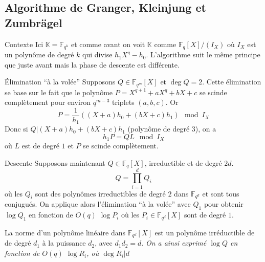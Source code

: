 \documentclass[xcolor=x11names,compress]{beamer}
\theoremstyle{break}
\theoremstyle{sc}
\theoremstyle{definition}
\theoremstyle{remark}
\begin{document}
\subsection{Algorithme de Granger, Kleinjung et Zumbrägel}

\begin{frame}{Contexte}
  Ici $\mathbb{K}=\mathbb{F}_{q^k}$ et comme avant on voit $\mathbb{K}$ comme
  $\mathbb{F}_q[X]/(I_X)$ où $I_X$ est un polynôme de degré $k$ qui divise
  $h_1X^q-h_0$. L'algorithme suit le même principe que juste avant mais la phase
  de descente est différente. 
\end{frame}

\begin{frame}{Élimination ``à la volée''}
  Supposons $Q\in \mathbb{F}_{q^m}[X]$ et $\deg Q = 2$. Cette élimination se base
  sur le fait que le polynôme $P = X^{q+1}+aX^q+bX+c$ se scinde complètement pour
  environ $q^{m-3}$ triplets $(a, b, c)$. Or 
  \[
    P = \frac{1}{h_1}((X+a)h_0 + (bX+c)h_1)\mod I_X
  \]
  Donc si $Q| (X+a)h_0 + (bX+c)h_1$ (polynôme de degré $3$), on a 
  \[
    h_1P=QL \mod I_X
  \]
  où $L$ est de degré $1$ et $P$ se scinde complètement.

\end{frame}

\begin{frame}{Descente}
  Supposons maintenant $Q\in\mathbb{F}_{q}[X]$, irreductible et de degré $2d$.
  \[
    Q=\prod_{i=1}^d Q_i
  \]
  où les $Q_i$ sont des polynômes irreductibles de degré $2$ dans
  $\mathbb{F}_{q^d}$ et sont tous conjugués. On applique alors
  l'élimination ``à la volée'' avec $Q_1$ pour obtenir $\log Q_1$ en fonction
  de $O(q)$ $\log P_i$ où les $P_i\in \mathbb{F}_{q^d}[X]$ sont de degré $1$.
  
  La norme d'un polynôme linéaire dans $\mathbb{F}_{q^d}[X]$ est un polynôme
  irréductible de de degré $d_1$ à la puissance $d_2$, avec $d_1d_2 = d$.
  \emph{On a ainsi exprimé $\log Q$ en fonction de $O(q)$ $\log R_i$, où $\deg
  R_i | d$}
\end{frame}

\end{document}
